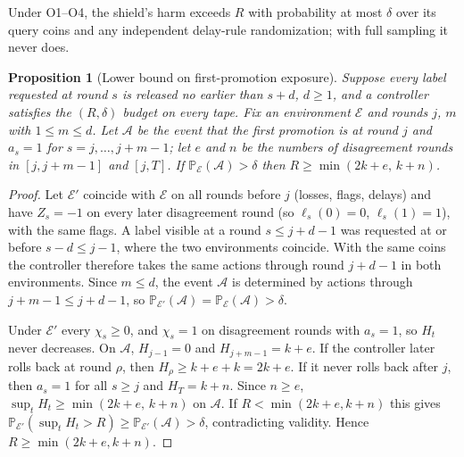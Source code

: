 \documentclass[10pt]{article}
\theoremstyle{plain}
\newtheorem{proposition}{Proposition}
\theoremstyle{definition}
\newcommand{\PP}{\mathbb{P}}
\begin{document}
Under O1--O4, the shield's harm exceeds $R$ with probability at most $\delta$ over its query coins and any independent delay-rule randomization; with full sampling it never does.

\begin{samepage}
\begin{proposition}[Lower bound on first-promotion exposure]\label{prop:reserves}
Suppose every label requested at round $s$ is released no earlier than $s+d$, $d\ge1$, and a controller satisfies the $(R,\delta)$ budget on every tape. Fix an environment $\mathcal E$ and rounds $j$, $m$ with $1\le m\le d$. Let $\mathcal A$ be the event that the first promotion is at round $j$ and $a_s=1$ for $s=j,\dots,j+m-1$; let $e$ and $n$ be the numbers of disagreement rounds in $[j,j+m-1]$ and $[j,T]$. If $\PP_{\mathcal E}(\mathcal A)>\delta$ then $R\ge\min(2k+e,\,k+n)$.
\end{proposition}
\end{samepage}
\begin{proof}
Let $\mathcal E'$ coincide with $\mathcal E$ on all rounds before $j$ (losses, flags, delays) and have $Z_s=-1$ on every later disagreement round (so $\ell_s(0)=0$, $\ell_s(1)=1$), with the same flags. A label visible at a round $s\le j+d-1$ was requested at or before $s-d\le j-1$, where the two environments coincide. With the same coins the controller therefore takes the same actions through round $j+d-1$ in both environments. Since $m\le d$, the event $\mathcal A$ is determined by actions through $j+m-1\le j+d-1$, so $\PP_{\mathcal E'}(\mathcal A)=\PP_{\mathcal E}(\mathcal A)>\delta$.

Under $\mathcal E'$ every $\chi_s\ge0$, and $\chi_s=1$ on disagreement rounds with $a_s=1$, so $H_t$ never decreases. On $\mathcal A$, $H_{j-1}=0$ and $H_{j+m-1}=k+e$. If the controller later rolls back at round $\rho$, then $H_\rho\ge k+e+k=2k+e$. If it never rolls back after $j$, then $a_s=1$ for all $s\ge j$ and $H_T=k+n$. Since $n\ge e$, $\sup_tH_t\ge\min(2k+e,\,k+n)$ on $\mathcal A$. If $R<\min(2k+e,k+n)$ this gives $\PP_{\mathcal E'}(\sup_tH_t>R)\ge\PP_{\mathcal E'}(\mathcal A)>\delta$, contradicting validity. Hence $R\ge\min(2k+e,k+n)$.
\end{proof}
\end{document}
